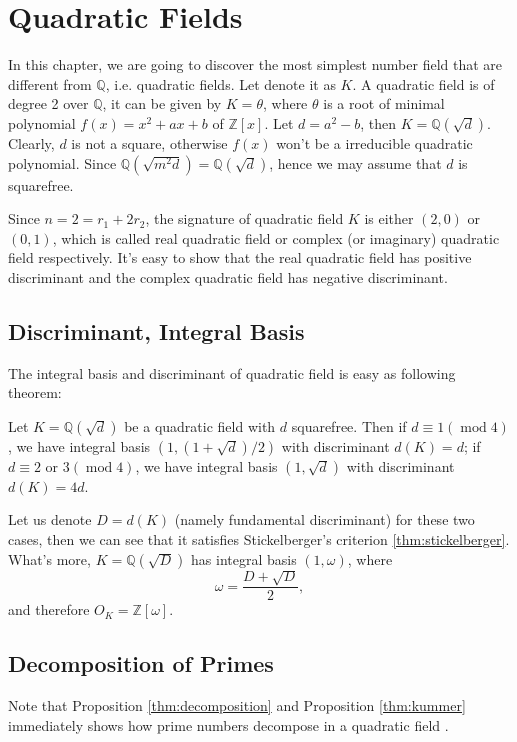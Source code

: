 \chapter{Quadratic Fields}
\label{chap:chap-four}
In this chapter, we are going to discover the most simplest number field that are different from
$\mathbb{Q}$, i.e. quadratic fields. Let denote it as $K$. A quadratic field is of degree 2 over $\mathbb{Q}$, it can be given by $K=\mathbb{\theta}$, where $\theta$ is a root of minimal polynomial $f(x)=x^2+a x+b$ of $\mathbb{Z}[x]$. Let $d=a^2-b$, then $K=\mathbb{Q}(\sqrt{d})$. Clearly, $d$ is not a square, otherwise $f(x)$ won't be a irreducible quadratic polynomial. Since $\mathbb{Q}(\sqrt{m^2d})=\mathbb{Q}(\sqrt{d})$, hence we may assume that $d$ is squarefree.

Since $n=2=r_1+2r_2$, the signature of quadratic field $K$ is either $(2,0)$ or $(0,1)$, which is called real quadratic field or complex (or imaginary) quadratic field respectively.
It's easy to show that the real quadratic field has positive discriminant and the complex quadratic field has negative discriminant.

\section{Discriminant, Integral Basis}
The integral basis and discriminant of quadratic field is easy as following theorem:
\begin{theorem}\label{thm:quad_disc}
Let $K=\mathbb{Q}(\sqrt{d})$ be a quadratic field with $d$ squarefree. Then if $d\equiv1(\operatorname{mod} 4)$, we have integral basis $(1,(1+\sqrt{d})/2)$ with discriminant $d(K)=d$; if $d\equiv2\text{ or }3(\operatorname{mod} 4)$, we have integral basis $(1,\sqrt{d})$ with discriminant $d(K)=4d$.
\end{theorem}

Let us denote $D=d(K)$ (namely fundamental discriminant) for these two cases, then we can see that it satisfies Stickelberger's criterion \ref{thm:stickelberger}. What's more, $K=\mathbb{Q} (\sqrt{D})$ has integral basis $(1,\omega)$, where $$\omega=\frac{D+\sqrt{D}}{2},$$ and therefore $O_K=\mathbb{Z}[\omega]$.

\section{Decomposition of Primes}
Note that Proposition \ref{thm:decomposition} and Proposition \ref{thm:kummer} immediately shows how prime numbers decompose in a quadratic field \citep{Xianke2006ANT}.


